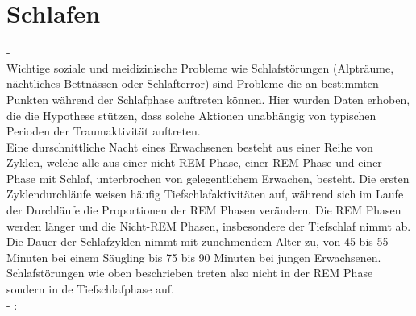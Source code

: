 \section{Schlafen}\label{sec:relatedWork.schlafen}

- \cite{broughton1968sleep}\\
Wichtige soziale und meidizinische Probleme wie Schlafstörungen (Alpträume, nächtliches Bettnässen oder Schlafterror) sind Probleme die an bestimmten Punkten während der Schlafphase auftreten können. Hier wurden Daten erhoben, die die Hypothese stützen, dass solche Aktionen unabhängig von typischen Perioden der Traumaktivität auftreten.\\
Eine durschnittliche Nacht eines Erwachsenen besteht aus einer Reihe von Zyklen, welche alle aus einer nicht-REM Phase, einer REM Phase und einer Phase mit Schlaf, unterbrochen von gelegentlichem Erwachen, besteht. Die ersten Zyklendurchläufe weisen häufig Tiefschlafaktivitäten auf, während sich im Laufe der Durchläufe die Proportionen der REM Phasen verändern. Die REM Phasen werden länger und die Nicht-REM Phasen, insbesondere der Tiefschlaf nimmt ab. Die Dauer der Schlafzyklen nimmt mit zunehmendem Alter zu, von 45 bis 55 Minuten bei einem Säugling bis 75 bis 90 Minuten bei jungen Erwachsenen.\\
Schlafstörungen wie oben beschrieben treten also nicht in der REM Phase sondern in de Tiefschlafphase auf.\\%


- \cite{dinges1985assessing}:\\

